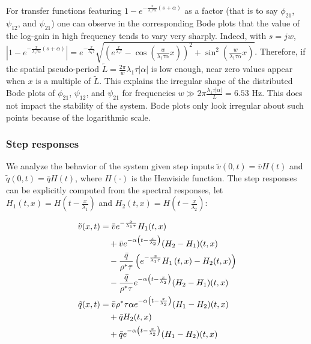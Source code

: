 \documentclass[a4paper, 10pt, conference]{ieeeconf}      %
\begin{document}
For transfer functions featuring $1 - e^{-\frac{x}{\lambda_{1} \tau \alpha} \left(s + \alpha \right)}$ as a factor (that is to say $\phi_{21}$, $\psi_{12}$, and $\psi_{21}$) one can observe in the corresponding Bode plots that the value of the log-gain in high frequency tends to vary very sharply. Indeed, with $s = jw$,
$
\left| 
	1 - e^{-\frac{x}{\lambda_{1} \tau \alpha} \left(s + \alpha\right)}
\right| = 
e^{-\frac{x}{\lambda_{1} \tau}}
\sqrt{
	\left(
		e^{\frac{x}{\lambda_{1}\tau}} 
		-
		\cos\left(\frac{w}{\lambda_{1} \tau \alpha} x\right)
	\right)^{2}
	+
	\sin^{2}\left( \frac{w}{\lambda_{1} \tau \alpha} x \right)
}
$. Therefore, if the spatial pseudo-period $\tilde{L}=\frac{2\pi}{w} \lambda_{1} \tau \left|\alpha\right|$ is low enough, near zero values appear when $x$ is a multiple of $\tilde{L}$. This explains the irregular shape of the distributed Bode plots of $\phi_{21}$, $\psi_{12}$, and $\psi_{21}$ for frequencies $w \gg 2 \pi \frac{\lambda_{1} \tau \left|\alpha\right|}{L} = 6.53$ Hz. This does not impact the stability of the system. Bode plots only look irregular about such points because of the logarithmic scale.

\subsubsection{Step responses}
We analyze the behavior of the system given step inputs $\tilde{v}(0,t)=\bar{v}H(t)$ and $\tilde{q}(0,t)=\bar{q}H(t)$, where $H(\cdot)$ is the Heaviside function. The step responses can be explicitly computed from the spectral responses, let $H_1(t,x) = H\left(t-\frac{x}{\lambda_{1}}\right)$ and
$H_2(t,x) = H\left(t - \frac{x}{\lambda_{2}} \right)$:

\begin{align} 
\tilde{v}(x,t) &= 
\bar{v}
e^{-\frac{x}{\lambda_{1}\tau}}H_1(t,x)
\notag\\
&\quad
+\bar{v}
e^{-\alpha \left(t - \frac{x}{\lambda_{2}} \right)}
	(H_2 - H_1)(t,x)
\notag \\
&\quad
- \dfrac{\bar{q}}{\rho^* \tau}
\left(
	e^{-\frac{x}{\lambda_{1}\tau}}H_1\left(t,x\right) 
	- H_2(t,x)
\right) 
\notag\\
&\quad
- \dfrac{\bar{q}}{\rho^* \tau} e^{-\alpha \left(t - \frac{x}{\lambda_{2}} \right)}
	(H_2 - H_1)(t,x)\\
\tilde{q}(x,t) &= \bar{v} \rho^*\tau \alpha e^{-\alpha \left(t - \frac{x}{\lambda_{2}} \right)}
	(H_1 - H_2)(t,x)
\notag \\
&\quad+ 
\bar{q}
H_2(t,x)
\notag\\
&\quad
+
\bar{q}
e^{-\alpha \left(t - \frac{x}{\lambda_{2}} \right)}
	(H_1 - H_2)(t,x)	
\end{align}
\end{document}
